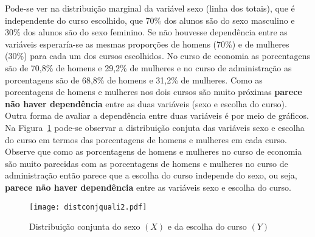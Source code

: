 \documentclass[11pt,fleqn]{book} %
\begin{document}
\begin{example}
Pode-se ver na distribuição marginal da variável sexo (linha dos totais), que é independente do curso escolhido, que 70\% dos alunos são do sexo masculino e 30\% dos alunos são  do sexo feminino. Se não houvesse dependência entre as variáveis esperaría-se as mesmas proporções de homens (70\%) e de mulheres (30\%) para cada um dos cursos escolhidos. No curso de economia as porcentagens são de 70,8\% de homens e 29,2\% de mulheres e no curso de administração as porcentagens são de 68,8\% de homens e 31,2\% de mulheres. Como as porcentagens de homens e mulheres nos dois cursos são muito próximas {\bf parece não haver dependência} entre as duas variáveis (sexo e escolha do curso). \\

Outra forma de avaliar a dependência entre duas variáveis é por meio de gráficos. Na Figura~\ref{fig:distconjsexocurso1} pode-se observar a distribuição conjuta das variáveis sexo e escolha do curso em termos das porcentagens de homens e mulheres em cada curso. Observe que como as porcentagens de homens e mulheres no curso de economia são muito parecidas com as porcentagens de homens e mulheres no curso de administração então parece que a escolha do curso independe do sexo, ou seja, {\bf parece não haver dependência} entre as variáveis sexo e escolha do curso.


\begin{figure}[h!]
\vspace{0,3cm}
\centering\texttt{[image: distconjquali2.pdf]}
\setlength{\abovecaptionskip}{0.5pt}
\caption{Distribuição conjunta do sexo $(X)$ e da escolha do curso $(Y)$}
\label{fig:distconjsexocurso1} %
\vspace{0.5cm}
\end{figure}


\end{example}



\vspace{1cm}
\end{document}
